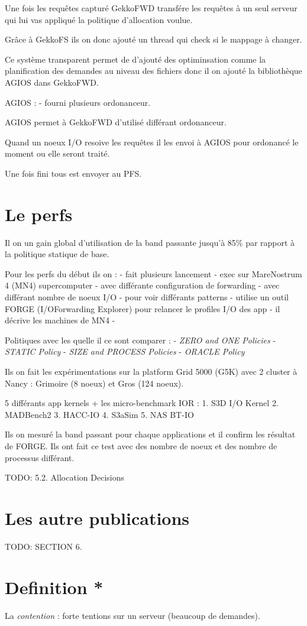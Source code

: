 \documentclass[10pt, a4paper]{article}
\begin{document}
Une fois les requêtes capturé GekkoFWD transfére les requêtes à un seul serveur qui lui vas appliqué la politique d'allocation voulue.

Grâce à GekkoFS ils on donc ajouté un thread qui check si le mappage à changer.

Ce système transparent permet de d'ajouté des optiminsation comme la planification des demandes au niveau des fichiers donc il on ajouté la bibliothèque AGIOS dans GekkoFWD.

AGIOS :
- fourni plusieurs ordonanceur.

AGIOS permet à GekkoFWD d'utilisé différant ordonanceur.

Quand un noeux I/O resoive les requêtes il les envoi à AGIOS pour ordonancé le moment ou elle seront traité.

Une fois fini tous est envoyer au PFS.

\section{Le perfs}

Il on un gain global d'utilisation de la band passante jusqu'à 85\% par rapport à la politique statique de base.

Pour les perfs du début ils on :
- fait plusieurs lancement
- exec sur MareNostrum 4 (MN4) supercomputer
- avec différante configuration de forwarding
- avec différant nombre de noeux I/O
- pour voir différants patterns
- utilise un outil FORGE (I/OForwarding Explorer) pour relancer le profiles I/O des app
- il décrive les machines de MN4
- 

Politiques avec les quelle il ce sont comparer :
- \emph{ZERO and ONE Policies}
- \emph{STATIC Policy}
- \emph{SIZE and PROCESS Policies}
- \emph{ORACLE Policy}


Ils on fait les expérimentations sur la platform Grid 5000 (G5K) avec 2 cluster à Nancy : Grimoire (8 noeux) et Gros (124 noeux). %

5 différants app kernels + les micro-benchmark IOR :
1. S3D I/O Kernel
2. MADBench2
3. HACC-IO
4. S3aSim
5. NAS BT-IO

Ils on mesuré la band passant pour chaque applications et il confirm les résultat de FORGE. Ils ont fait ce test avec des nombre de noeux et des nombre de processus différant.

TODO: 5.2. Allocation Decisions


\section{Les autre publications}

TODO: SECTION 6.

\section{Definition *}

La \emph{contention} : forte tentions sur un serveur (beaucoup de demandes).
\end{document}
